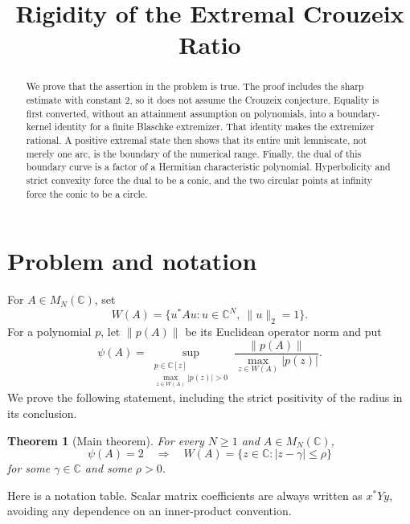 \documentclass[11pt]{article}
\title{Rigidity of the Extremal Crouzeix Ratio}
\author{}
\date{}
\newtheorem{theorem}{Theorem}[section]
\theoremstyle{definition}
\theoremstyle{remark}
\newcommand{\C}{\mathbb C}
\begin{document}
\maketitle

\begin{abstract}
We prove that the assertion in the problem is true.  The proof includes the
sharp estimate with constant \(2\), so it does not assume the Crouzeix
conjecture.  Equality is first converted, without an attainment assumption on
polynomials, into a boundary-kernel identity for a finite Blaschke extremizer.
That identity makes the extremizer rational.  A positive extremal state then
shows that its entire unit lemniscate, not merely one arc, is the boundary of
the numerical range.  Finally, the dual of this boundary curve is a factor of
a Hermitian characteristic polynomial.  Hyperbolicity and strict convexity
force the dual to be a conic, and the two circular points at infinity force the
conic to be a circle.
\end{abstract}

\section{Problem and notation}

For \(A\in M_N(\C)\), set
\[
 W(A)=\{u^*Au:u\in\C^N,\ \|u\|_2=1\}.
\]
For a polynomial \(p\), let \(\|p(A)\|\) be its Euclidean operator norm and put
\[
 \psi(A)=
 \sup_{\substack{p\in\C[z]\\ \max_{z\in W(A)}|p(z)|>0}}
 \frac{\|p(A)\|}{\max_{z\in W(A)}|p(z)|}.
\]
We prove the following statement, including the strict positivity of the
radius in its conclusion.

\begin{theorem}[Main theorem]\label{thm:main}
For every \(N\geq1\) and \(A\in M_N(\C)\),
\[
 \psi(A)=2\quad\Longrightarrow\quad
 W(A)=\{z\in\C:|z-\gamma|\leq\rho\}
\]
for some \(\gamma\in\C\) and some \(\rho>0\).
\end{theorem}

Here is a notation table.  Scalar matrix coefficients are always written as
\(x^*Yy\), avoiding any dependence on an inner-product convention.
\end{document}
